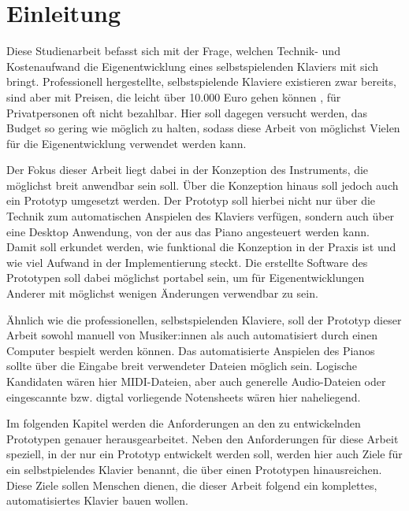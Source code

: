 
\chapter{Einleitung} \label{einleitung}

\nocite{*}

Diese Studienarbeit befasst sich mit der Frage, welchen Technik- und Kostenaufwand die Eigenentwicklung eines selbstspielenden Klaviers mit sich bringt.
Professionell hergestellte, selbstspielende Klaviere existieren zwar bereits, sind aber mit Preisen, die leicht über 10.000 Euro gehen können \cite{YamahaU1}, für Privatpersonen oft nicht bezahlbar.
Hier soll dagegen versucht werden, das Budget so gering wie möglich zu halten, sodass diese Arbeit von möglichst Vielen für die Eigenentwicklung verwendet werden kann.

Der Fokus dieser Arbeit liegt dabei in der Konzeption des Instruments, die möglichst breit anwendbar sein soll. %
Über die Konzeption hinaus soll jedoch auch ein Prototyp umgesetzt werden.
Der Prototyp soll hierbei nicht nur über die Technik zum automatischen Anspielen des Klaviers verfügen, sondern auch über eine Desktop Anwendung, von der aus das Piano angesteuert werden kann.
Damit soll erkundet werden, wie funktional die Konzeption in der Praxis ist und wie viel Aufwand in der Implementierung steckt.
Die erstellte Software des Prototypen soll dabei möglichst portabel sein, um für Eigenentwicklungen Anderer mit möglichst wenigen Änderungen verwendbar zu sein.

Ähnlich wie die professionellen, selbstspielenden Klaviere, soll der Prototyp dieser Arbeit sowohl manuell von Musiker:innen als auch automatisiert durch einen Computer bespielt werden können.
Das automatisierte Anspielen des Pianos sollte über die Eingabe breit verwendeter Dateien möglich sein.
Logische Kandidaten wären hier \ac{MIDI}-Dateien, aber auch generelle Audio-Dateien oder eingescannte bzw. digtal vorliegende Notensheets wären hier naheliegend.

Im folgenden Kapitel werden die Anforderungen an den zu entwickelnden Prototypen genauer herausgearbeitet.
Neben den Anforderungen für diese Arbeit speziell, in der nur ein Prototyp entwickelt werden soll, werden hier auch Ziele für ein selbstpielendes Klavier benannt, die über einen Prototypen hinausreichen.
Diese Ziele sollen Menschen dienen, die dieser Arbeit folgend ein komplettes, automatisiertes Klavier bauen wollen.

